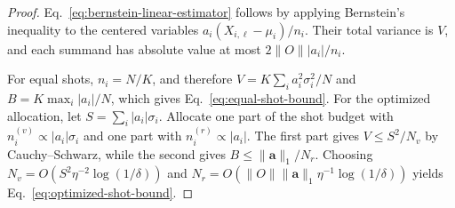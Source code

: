 \documentclass[aps,pra,reprint,groupedaddress,floatfix]{revtex4-2}
\begin{document}
\begin{proof}
Eq.~\eqref{eq:bernstein-linear-estimator} follows by applying Bernstein's inequality to the centered variables $a_i(X_{i,\ell}-\mu_i)/n_i$. Their total variance is $V$, and each summand has absolute value at most $2\|O\||a_i|/n_i$.

For equal shots, $n_i=N/K$, and therefore $V=K\sum_i a_i^2\sigma_i^2/N$ and $B=K\max_i|a_i|/N$, which gives Eq.~\eqref{eq:equal-shot-bound}. For the optimized allocation, let $S=\sum_i |a_i|\sigma_i$. Allocate one part of the shot budget with $n_i^{(v)}\propto |a_i|\sigma_i$ and one part with $n_i^{(r)}\propto |a_i|$. The first part gives $V\le S^2/N_v$ by Cauchy--Schwarz, while the second gives $B\le \|\mathbf a\|_1/N_r$. Choosing $N_v=O(S^2\eta^{-2}\log(1/\delta))$ and $N_r=O(\|O\|\|\mathbf a\|_1\eta^{-1}\log(1/\delta))$ yields Eq.~\eqref{eq:optimized-shot-bound}.
\end{proof}
\end{document}
